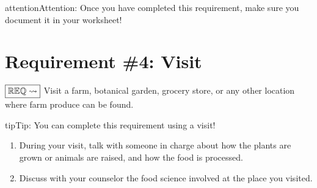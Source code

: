 \documentclass[letterpaper,10pt,english,openany,oneside]{sphinxmanual}
\begin{document}
\begin{sphinxadmonition}{attention}{Attention:}
Once you have completed this requirement, make sure you document it in your worksheet!
\end{sphinxadmonition}


\chapter{Requirement \#4: Visit}
\label{\detokenize{requirement4:requirement-4-visit}}\label{\detokenize{requirement4::doc}}
\(\boxed{\mathbb{REQ}\Large \rightsquigarrow}\) Visit a farm, botanical garden, grocery store, or any other location where farm produce can be found.

\begin{sphinxadmonition}{tip}{Tip:}
You can complete this requirement using a  visit!
\end{sphinxadmonition}
\begin{enumerate}
%
\item {} 
During your visit, talk with someone in charge about how the plants are grown or animals are raised, and how the food is processed.

\item {} 
Discuss with your counselor the food science involved at the place you visited.

\end{enumerate}
\end{document}
